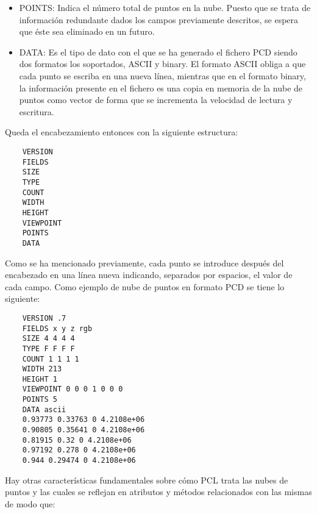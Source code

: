 \begin{itemize}
\item POINTS:
Indica el número total de puntos en la nube. Puesto que se trata de información redundante dados los campos previamente descritos, se espera que éste sea eliminado en un futuro.

\item DATA:
Es el tipo de dato con el que se ha generado el fichero PCD siendo dos formatos los soportados, ASCII y binary. El formato ASCII obliga a que cada punto se escriba en una nueva línea, mientras que en el formato binary, la información presente en el fichero es una copia en memoria de la nube de puntos como vector de forma que se incrementa la velocidad de lectura y escritura.
\end{itemize}

Queda el encabezamiento entonces con la siguiente estructura:
\begin{lstlisting}
	VERSION
	FIELDS
	SIZE
	TYPE
	COUNT
	WIDTH
	HEIGHT
	VIEWPOINT
	POINTS
	DATA
\end{lstlisting}

Como se ha mencionado previamente, cada punto se introduce después del encabezado en una línea nueva indicando, separados por espacios, el valor de cada campo. Como ejemplo de nube de puntos en formato PCD se tiene lo siguiente:

\begin{lstlisting}
	VERSION .7
	FIELDS x y z rgb
	SIZE 4 4 4 4
	TYPE F F F F
	COUNT 1 1 1 1
	WIDTH 213
	HEIGHT 1
	VIEWPOINT 0 0 0 1 0 0 0
	POINTS 5
	DATA ascii
	0.93773 0.33763 0 4.2108e+06
	0.90805 0.35641 0 4.2108e+06
	0.81915 0.32 0 4.2108e+06
	0.97192 0.278 0 4.2108e+06
	0.944 0.29474 0 4.2108e+06
\end{lstlisting}

Hay otras características fundamentales\cite{PCD_extras} sobre cómo PCL trata las nubes de puntos y las cuales se reflejan en atributos y métodos relacionados con las mismas de modo que:

